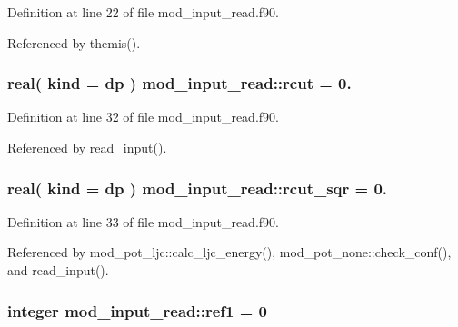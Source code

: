 Definition at line 22 of file mod\+\_\+input\+\_\+read.\+f90.



Referenced by themis().

\subsubsection[{\texorpdfstring{rcut}{rcut}}]{\setlength{\rightskip}{0pt plus 5cm}real( kind = dp ) mod\+\_\+input\+\_\+read\+::rcut = 0.}\hypertarget{namespacemod__input__read_ad16f7026be229b0b283174a293fe570e}{}\label{namespacemod__input__read_ad16f7026be229b0b283174a293fe570e}


Definition at line 32 of file mod\+\_\+input\+\_\+read.\+f90.



Referenced by read\+\_\+input().

\subsubsection[{\texorpdfstring{rcut\+\_\+sqr}{rcut_sqr}}]{\setlength{\rightskip}{0pt plus 5cm}real( kind = dp ) mod\+\_\+input\+\_\+read\+::rcut\+\_\+sqr = 0.}\hypertarget{namespacemod__input__read_a4c4705d35961d02b4275f73e44077819}{}\label{namespacemod__input__read_a4c4705d35961d02b4275f73e44077819}


Definition at line 33 of file mod\+\_\+input\+\_\+read.\+f90.



Referenced by mod\+\_\+pot\+\_\+ljc\+::calc\+\_\+ljc\+\_\+energy(), mod\+\_\+pot\+\_\+none\+::check\+\_\+conf(), and read\+\_\+input().

\subsubsection[{\texorpdfstring{ref1}{ref1}}]{\setlength{\rightskip}{0pt plus 5cm}integer mod\+\_\+input\+\_\+read\+::ref1 = 0}\hypertarget{namespacemod__input__read_a1fffe01a8c7b8966aa213553649f0cce}{}\label{namespacemod__input__read_a1fffe01a8c7b8966aa213553649f0cce}


